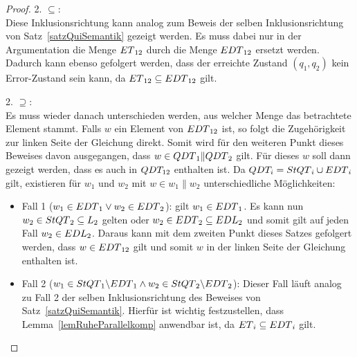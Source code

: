 \begin{proof}
  2. \glqq{}$\subseteq$\grqq{}:\\
  Diese Inklusionsrichtung kann analog zum Beweis der selben Inklusionsrichtung
  von Satz~\ref{satzQuiSemantik} gezeigt werden. Es muss dabei nur in der
  Argumentation die Menge $ET{}_{12}$ durch die Menge $EDT{}_{12}$ ersetzt
  werden. Dadurch kann ebenso gefolgert werden, dass der erreichte Zustand
  $(q_1,q_2)$ kein Error-Zustand sein kann, da $ET{}_{12}\subseteq
  EDT{}_{12}$ gilt.

  2. \glqq{}$\supseteq$\grqq{}:\\
  Es muss wieder danach unterschieden werden, aus welcher Menge das betrachtete
  Element stammt. Falls $w$ ein Element von $EDT{}_{12}$ ist, so folgt die
  Zugehörigkeit zur linken Seite der Gleichung direkt. Somit wird für den
  weiteren Punkt dieses Beweises davon ausgegangen, dass $w\in
  QDT{}_1\|QDT{}_2$ gilt. Für dieses $w$ soll dann gezeigt werden, dass es
  auch in $QDT_{12}$ enthalten ist. Da $QDT_i=StQT{}_i\cup EDT{}_i$ gilt,
  existieren für $w_1$ und $w_2$ mit $w\in w_1\|w_2$ unterschiedliche
  Möglichkeiten:
  \begin{itemize}
    \item Fall 1 ($w_1\in EDT{}_1 \vee w_2\in EDT{}_2$): \OBdA{} gilt $w_1\in
      EDT{}_1$. Es kann nun $w_2\in StQT{}_2 \subseteq L_2$ gelten oder
      $w_2\in EDT{}_2\subseteq EDL{}_2$ und somit gilt auf jeden Fall $w_2\in
      EDL{}_2$. Daraus kann mit dem zweiten Punkt dieses Satzes gefolgert
      werden, dass $w\in EDT{}_{12}$ gilt und somit $w$ in der linken Seite
      der Gleichung enthalten ist.
    \item Fall 2 ($w_1\in StQT{}_1\backslash EDT{}_1 \wedge w_2\in StQT{}_2
      \backslash EDT{}_2$): Dieser Fall läuft analog zu Fall 2 der selben
      Inklusionsrichtung des Beweises von Satz~\ref{satzQuiSemantik}. Hierfür
      ist wichtig festzustellen, dass Lemma~\ref{lemRuheParallelkomp} anwendbar
      ist, da $ET{}_i\subseteq EDT{}_i$ gilt.
  \end{itemize}


\end{proof}
